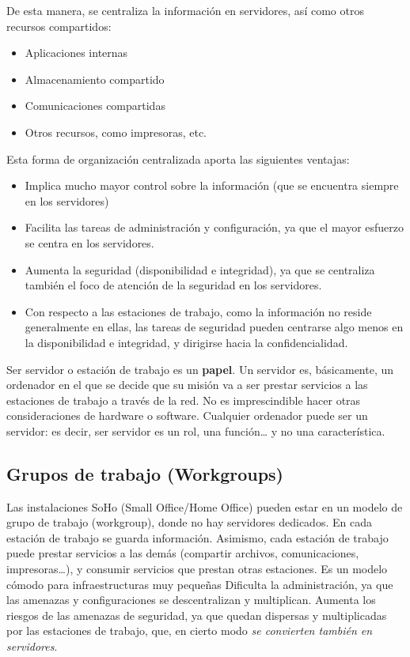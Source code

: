 \documentclass{article}
\begin{document}
De esta manera, se centraliza la información en servidores, así como otros recursos compartidos:
\begin{itemize}
\item Aplicaciones internas
\item Almacenamiento compartido
\item Comunicaciones compartidas
\item Otros recursos, como impresoras, etc.
\end{itemize}

Esta forma de organización centralizada aporta las siguientes ventajas:
\begin{itemize}
\item Implica mucho mayor control sobre la información (que se encuentra siempre en los servidores)
\item Facilita las tareas de administración y configuración, ya que el mayor esfuerzo se centra en los servidores.
\item Aumenta la seguridad (disponibilidad e integridad), ya que se centraliza también el foco de atención de la seguridad en los servidores.
\item Con respecto a las estaciones de trabajo, como la información no reside generalmente en ellas, las tareas de seguridad pueden centrarse algo menos en la disponibilidad e integridad, y dirigirse hacia la confidencialidad.
\end{itemize}

Ser servidor o estación de trabajo es un \textbf{papel}. Un servidor es, básicamente, un ordenador en el que se decide que su misión va a ser prestar servicios a las estaciones de trabajo a través de la red. No es imprescindible hacer otras consideraciones de hardware o software. Cualquier ordenador puede ser un servidor: es decir, ser servidor es un rol, una función… y no una característica.

\subsection{Grupos de trabajo (Workgroups)}
\label{sec:orgd723bf8}
Las instalaciones SoHo (Small Office/Home Office) pueden estar en un modelo de grupo de trabajo (workgroup), donde no hay servidores dedicados.
En cada estación de trabajo se guarda información.
Asimismo, cada estación de trabajo puede prestar servicios a las demás (compartir archivos, comunicaciones, impresoras…), y consumir servicios que prestan otras estaciones.
Es un modelo cómodo para infraestructuras muy pequeñas
Dificulta la administración, ya que las amenazas y configuraciones se descentralizan y multiplican.
Aumenta los riesgos de las amenazas de seguridad, ya que quedan dispersas y multiplicadas por las estaciones de trabajo, que, en cierto modo \emph{se convierten también en servidores}.
\end{document}
